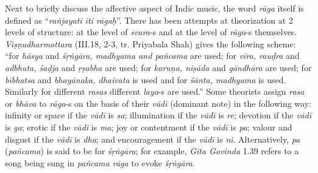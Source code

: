Next to briefly discuss the affective aspect of Indic music, the word \textsl{rāga} itself is defined as “\textsl{rañjayati iti rāgaḥ}”. There has been attempts at theorization at 2 levels of structure: at the level of \textsl{svara}-s and at the level of \textsl{rāga}-s themselves. \textsl{Viṣṇudharmottara} (III.18, 2-3, tr. Priyabala Shah) gives the following scheme: “for \textsl{hāsya} and \textsl{śṛṅgāra, madhyama and pañcama} are used; for \textsl{vīra, rauḍra} and \textsl{adbhuta, śaḍja} and \textsl{ṛṣabha} are used; for \textsl{karuṇa, niṣāda} and \textsl{gāndhāra} are used; for \textsl{bībhatsa} and \textsl{bhayānaka, dhaivata} is used and for \textsl{śānta, madhyama} is used. Similarly for different \textsl{rasas} different \textsl{laya}-s are used.” Some theorists assign \textsl{rasa} or \textsl{bhāva} to \textsl{rāga}-s on the basis of their \textsl{vādī} (dominant note) in the following way: infinity or space if the \textsl{vādī} is \textsl{sa}; illumination if the \textsl{vādī} is \textsl{re}; devotion if the \textsl{vādī} is \textsl{ga}; erotic if the \textsl{vādī} is \textsl{ma}; joy or contentment if the \textsl{vādī} is \textsl{pa}; valour and disgust if the \textsl{vādī} is \textsl{dha}; and encouragement if the \textsl{vādī} is \textsl{ni}. Alternatively, \textsl{pa} (\textsl{pañcama}) is said to be for \textsl{śṛṅgāra}; for example, \textsl{Gita Govinda} 1.39 refers to a song being sung in \textsl{pañcama rāga} to evoke \textsl{śṛṅgāra}.

